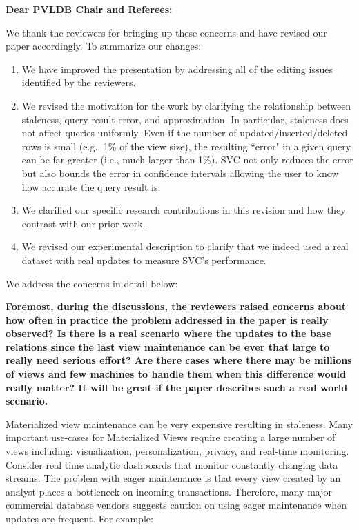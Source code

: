 {\noindent \normalsize \bf Dear PVLDB Chair and Referees: }

We thank the reviewers for bringing up these concerns and have revised our paper accordingly. To summarize our changes:
\begin{enumerate}[noitemsep]
\item We have improved the presentation by addressing all of the editing issues identified by the reviewers.
\item We revised the motivation for the work by clarifying the relationship between staleness, query result error, and approximation. In particular, staleness does not affect queries uniformly. Even if the number of updated/inserted/deleted rows is small (e.g., 1\% of the view size), the resulting ``error" in a given query can be far greater (i.e., much larger than 1\%). %
SVC not only reduces the error but also bounds the error in confidence intervals allowing the user to know how accurate the query result is.
\item We clarified our specific research contributions in this revision and how they contrast with our prior work.
\item We revised our experimental description to clarify that we indeed used a real dataset with real updates to measure SVC's performance. 
\end{enumerate}

We address the concerns in detail below: 

\vspace{1.5em}

\textbf{Foremost, during the discussions, the reviewers raised concerns about how often in practice the problem addressed in the paper is really observed? Is there is a real scenario where the updates to the base relations since the last view maintenance can be ever that large to really need serious effort? Are there cases where there may be millions of views and few machines to handle them when this difference would really matter? It will be great if the paper describes such a real world scenario.}

Materialized view maintenance can be very expensive resulting in staleness. Many important use-cases for Materialized Views require creating a large number of views including: visualization, personalization, privacy, and real-time monitoring. 
 Consider real time analytic dashboards that monitor constantly changing data streams.  
The problem with eager maintenance is that every view created by an analyst places a bottleneck on incoming transactions.  Therefore, many major commercial database vendors suggests caution on using eager maintenance when updates are frequent. For example:

